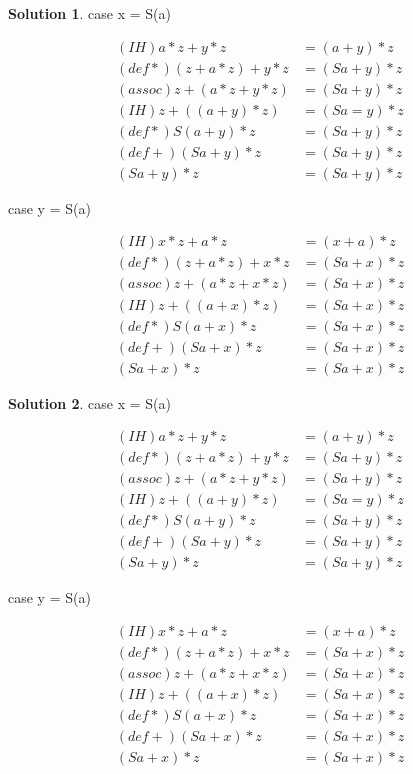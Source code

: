 \documentclass[10pt]{article}
\theoremstyle{definition}
\newtheorem{sol}{Solution}
\begin{document}
\begin{sol}

case x = S(a) 
 
\begin{align*}
(IH) a*z + y * z &= (a + y) * z \\
(def *) (z + a*z) + y* z &= (Sa + y) * z \\
(assoc) z + (a*z + y*z) &= (Sa + y) * z \\
(IH) z + ((a+y)*z) &= (Sa = y) * z \\
(def *) S(a+y) * z &= (Sa + y) * z \\
(def +) (Sa+y) * z &= (Sa + y) * z \\
(Sa + y) * z &= (Sa + y) * z
\end{align*}

case y = S(a) 
 
\begin{align*}
(IH) x*z + a * z &= (x + a) * z \\
(def *) (z + a*z) + x* z &= (Sa + x) * z \\
(assoc) z + (a*z + x*z) &= (Sa + x) * z \\
(IH) z + ((a+x)*z) &= (Sa + x) * z \\
(def *) S(a+x) * z &= (Sa + x) * z \\
(def +) (Sa+x) * z &= (Sa + x) * z \\
(Sa + x) * z &= (Sa + x) * z
\end{align*}
	
\end{sol}


\begin{sol}

case x = S(a) 
 
\begin{align*}
(IH) a*z + y * z &= (a + y) * z \\
(def *) (z + a*z) + y* z &= (Sa + y) * z \\
(assoc) z + (a*z + y*z) &= (Sa + y) * z \\
(IH) z + ((a+y)*z) &= (Sa = y) * z \\
(def *) S(a+y) * z &= (Sa + y) * z \\
(def +) (Sa+y) * z &= (Sa + y) * z \\
(Sa + y) * z &= (Sa + y) * z
\end{align*}

case y = S(a) 
 
\begin{align*}
(IH) x*z + a * z &= (x + a) * z \\
(def *) (z + a*z) + x* z &= (Sa + x) * z \\
(assoc) z + (a*z + x*z) &= (Sa + x) * z \\
(IH) z + ((a+x)*z) &= (Sa + x) * z \\
(def *) S(a+x) * z &= (Sa + x) * z \\
(def +) (Sa+x) * z &= (Sa + x) * z \\
(Sa + x) * z &= (Sa + x) * z
\end{align*}
	
\end{sol}
\end{document}
